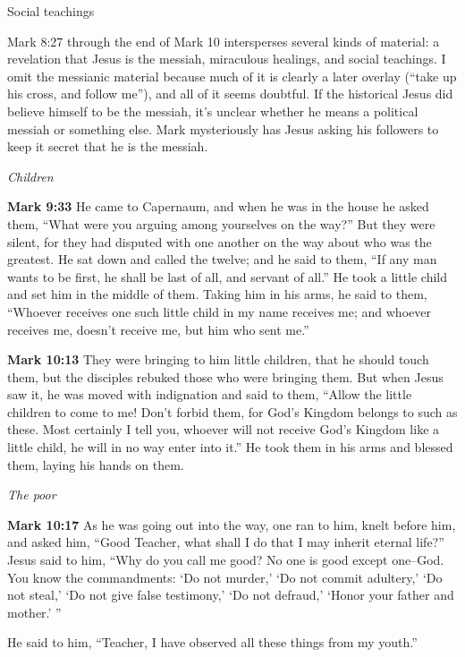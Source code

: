 \documentclass[10pt,twoside]{book}
\newcommand{\quotesize}{\normalsize{}}
\newcommand{\comm}[1]{\begingroup \color{black!50} #1\endgroup}
\newenvironment{quotetext}{\begingroup\quotesize}{\endgroup}
\newcommand{\bible}[2]{\begin{quotetext}\textbf{#1} #2\end{quotetext}}
\newcommand{\gospelmark}[2]{\bible{Mark #1}{#2}}
\newcommand{\subhead}[1]{\emph{#1}\par}
\begin{document}
\begin{section}{Social teachings}

\comm{
Mark 8:27 through the end of Mark 10 intersperses several kinds of material: a revelation that Jesus is the messiah,
miraculous healings, and social teachings. I omit the messianic material because much of it is clearly a later overlay
(``take up his cross, and follow me''),
and all of it seems doubtful. If the historical Jesus did believe himself to be the messiah, it's unclear
whether he means a political messiah or something else.
Mark mysteriously has Jesus asking his followers to keep it secret that he is the messiah.
}

\subhead{Children}

\gospelmark{9:33}{
 He came to Capernaum, and when he was in the house he asked them, ``What were you arguing among yourselves on the way?''
  But they were silent, for they had disputed with one another on the way about who was the greatest.
  He sat down and called the twelve; and he said to them, ``If any man wants to be first, he shall be last of all, and servant of all.''   He took a little child and set him in the middle of them. Taking him in his arms, he said to them,    ``Whoever receives one such little child in my name receives me; and whoever receives me, doesn't receive me, but him who sent me.'' 
}

\gospelmark{10:13}{
They were bringing to him little children, that he should touch them, but the disciples rebuked those who were bringing them.   But when Jesus saw it, he was moved with indignation and said to them, ``Allow the little children to come to me! Don't forbid them, for God's Kingdom belongs to such as these.    Most certainly I tell you, whoever will not receive God's Kingdom like a little child, he will in no way enter into it.''   He took them in his arms and blessed them, laying his hands on them.
}

\subhead{The poor}

\gospelmark{10:17}{
As he was going out into the way, one ran to him, knelt before him, and asked him, ``Good Teacher, what shall I do that I may inherit eternal life?''
  Jesus said to him, ``Why do you call me good? No one is good except one--God.    You know the commandments: `Do not murder,' `Do not commit adultery,' `Do not steal,' `Do not give false testimony,' `Do not defraud,' `Honor your father and mother.' ''

  He said to him, ``Teacher, I have observed all these things from my youth.''

}
\end{section}
\end{document}
